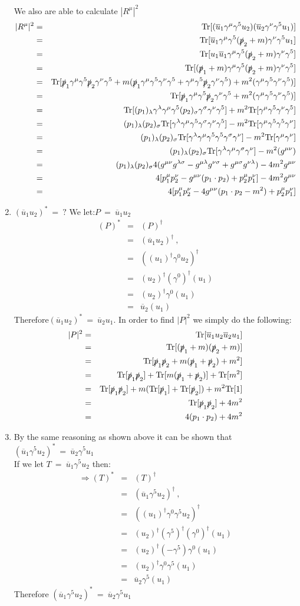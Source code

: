 \documentclass[12pt]{article}
\def \bea{\begin{eqnarray}}
\def \eea{\end{eqnarray}}
\def \Tr{{\rm Tr}}
\def \nn{\nonumber}
\def \nl{\nn \\}
\def \ou{\overline{u}}
\def \ga{\gamma}
\def \la{\lambda}
\def \si{\sigma}
\begin{document}
\begin{enumerate}
We also are able to calculate $|R^\mu|^2$
\bea
|R^{\mu}|^2 &=& \Tr[(\ou_1\ga^\mu \ga^5 u_2)(\ou_2 \ga^\nu \ga^5 u_1)] \nl
&=& \Tr[\ou_1\ga^\mu \ga^5 (\slashed{p}_2+m) \ga^\nu \ga^5 u_1]  \nl
&=&\Tr[u_1\ou_1\ga^\mu \ga^5 (\slashed{p}_2+m) \ga^\nu \ga^5 ]\nl
&=&\Tr[(\slashed{p}_1+m)\ga^\mu \ga^5 (\slashed{p}_2+m) \ga^\nu \ga^5 ]\nl
&=& \Tr[\slashed{p}_1\ga^\mu\ga^5 \slashed{p}_2\ga^\nu \ga^5 + m( \slashed{p}_1\ga^\mu\ga^5\ga^\nu \ga^5 +\ga^\mu\ga^5 \slashed{p}_2\ga^\nu \ga^5) + m^2(\ga^\mu\ga^5\ga^\nu \ga^5)] \nl
&=&\Tr[\slashed{p}_1\ga^\mu\ga^5 \slashed{p}_2\ga^\nu \ga^5 + m^2(\ga^\mu\ga^5\ga^\nu \ga^5)] \nl
&=& \Tr[(p_1)_\la\ga^\la\ga^\mu\ga^5 (p_2)_\si\ga^\si\ga^\nu \ga^5] + m^2\Tr[\ga^\mu\ga^5\ga^\nu \ga^5]\nl
&=& (p_1)_\la(p_2)_\si \Tr[\ga^\la\ga^\mu\ga^5 \ga^\si\ga^\nu \ga^5] - m^2\Tr[\ga^\mu\ga^5\ga^5 \ga^\nu]\nl
&=& (p_1)_\la(p_2)_\si \Tr[\ga^\la\ga^\mu\ga^5\ga^5 \ga^\si\ga^\nu] - m^2\Tr[\ga^\mu\ga^\nu]\nl
&=& (p_1)_\la(p_2)_\si \Tr[\ga^\la\ga^\mu\ga^\si\ga^\nu] - m^2(g^{\mu\nu})\nl
&=& (p_1)_\la(p_2)_\si 4(g^{\mu\nu}g^{\la\si} - g^{\mu\la} g^{\nu\si} + g^{\mu\si}g^{\nu\la}) - 4m^2g^{\mu\nu}\nl
&=& 4[p_1^\mu p_2^\nu - g^{\mu\nu}(p_1 \cdot p_2) + p_2^\mu p_1^\nu] - 4m^2g^{\mu\nu} \nl
&=& 4[p_1^\mu p_2^\nu - 4g^{\mu\nu}(p_1 \cdot p_2 - m^2) + p_2^\mu p_1^\nu]
\eea

\item $ (\ou_1 u_2)^* ~=~ ?$
We let:$P ~=~ \ou_1 u_2$
\bea
(P)^* &=& (P)^\dag \nl
&=& (\ou_1 u_2)^\dag ~,~~ \nl
&=& ((u_1)^\dag\ga^0 u_2)^\dag \nl
&=& (u_2)^\dag(\ga^0)^\dag(u_1)\nl
&=& (u_2)^\dag\ga^0(u_1)\nl
&=& \ou_2(u_1)
\eea
Therefore$(\ou_1 u_2)^* ~=~ \ou_2 u_1$.
In order to find $|P|^2$ we simply do the following:
\bea
|P|^2&=& \Tr[\ou_1 u_2 \ou_2 u_1]  \\
&=& \Tr[(\slashed{p}_1+m)(\slashed{p}_2+m)] \nl
&=& \Tr[\slashed{p}_1\slashed{p}_2+m(\slashed{p}_1+\slashed{p}_2)+m^2]\nl
&=& \Tr[\slashed{p}_1\slashed{p}_2]+\Tr[m(\slashed{p}_1+\slashed{p}_2)]+\Tr[m^2] \nl
&=& \Tr[\slashed{p}_1\slashed{p}_2]+m(\Tr[\slashed{p}_1]+\Tr[\slashed{p}_2])+m^2\Tr[1] \nl
&=& \Tr[\slashed{p}_1\slashed{p}_2]+4m^2 \nl
&=& 4(p_1 \cdot p_2)+4m^2
\eea

\item By the same reasoning as shown above it can be shown that $(\ou_1 \ga^5 u_2)^* ~=~ \ou_2 \ga^5 u_1$ \\
If we let $T ~=~ \ou_1\ga^5 u_2$ then:
\bea
\Rightarrow (T)^* &=& (T)^\dag  \\\
&=& (\ou_1\ga^5 u_2)^\dag ~,~~ \nl
&=& ((u_1)^\dag\ga^0\ga^5 u_2)^\dag \nl
&=& (u_2)^\dag(\ga^5)^\dag (\ga^0)^\dag(u_1)\nl
&=& (u_2)^\dag(-\ga^5) \ga^0(u_1)\nl
&=& (u_2)^\dag \ga^0\ga^5(u_1)\nl
&=& \ou_2\ga^5(u_1)
\eea
Therefore  $(\ou_1 \ga^5 u_2)^* ~=~ \ou_2 \ga^5 u_1$


\end{enumerate}
\end{document}
